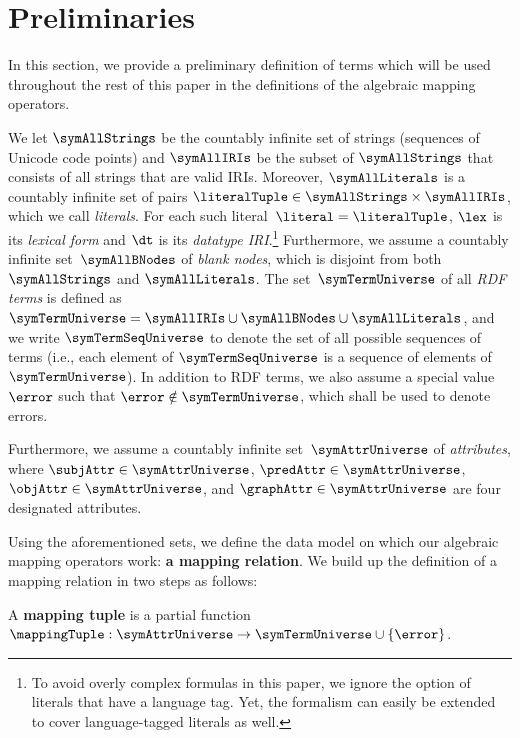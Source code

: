 \section{Preliminaries}
\label{sec:preliminaries}
In this section, we provide a preliminary definition of terms which will be
used throughout the rest of this paper in the definitions of
the algebraic mapping operators.

We let $\symAllStrings$ be the countably infinite set of strings (sequences of
Unicode code points) and $\symAllIRIs$ be the subset of $\symAllStrings$ that
consists of all strings that are valid IRIs. 
Moreover, $\symAllLiterals$ is a countably infinite set of pairs
$ \literalTuple \in \symAllStrings \times \symAllIRIs$, which we
call \emph{literals}. 
For each such literal~$\literal = \literalTuple$, $\lex$ is
its \emph{lexical form} and $\dt$ is its \emph{datatype
IRI}.\footnote{To avoid overly complex formulas in this paper, we ignore the
option of literals that have a language tag. Yet, the formalism can easily be
extended to cover language-tagged literals as well.}
Furthermore, we assume a countably infinite set~$\symAllBNodes$ of \emph{blank
nodes}, which is disjoint from both $\symAllStrings$ and $\symAllLiterals$. 
The set~$\symTermUniverse$ of all \emph{RDF terms} is defined as
$\symTermUniverse = \symAllIRIs \cup \symAllBNodes \cup \symAllLiterals$, and
we write $\symTermSeqUniverse$ to denote the set of all possible sequences of
terms (i.e., each element of $\symTermSeqUniverse$ is a sequence of elements of
$\symTermUniverse$). 
In addition to RDF terms, we also assume a special value $\error$ such that
$\error \notin \symTermUniverse$, which shall be used to denote errors.

Furthermore, we assume a countably infinite set~$\symAttrUniverse$ of
\emph{attributes}, where $\subjAttr \in \symAttrUniverse$,
$\predAttr \in \symAttrUniverse$, $\objAttr \in
\symAttrUniverse$, and $\graphAttr \in \symAttrUniverse$ are four
designated attributes.

Using the aforementioned sets, we define the data model on which our algebraic
mapping operators work: \textbf{a mapping relation}.
We build up the definition of a mapping relation in two steps as follows:


\begin{definition}
	A \textbf{mapping tuple} is a partial function $\mappingTuple:
		\symAttrUniverse \rightarrow \symTermUniverse \cup \{\error\}$.
\end{definition}

